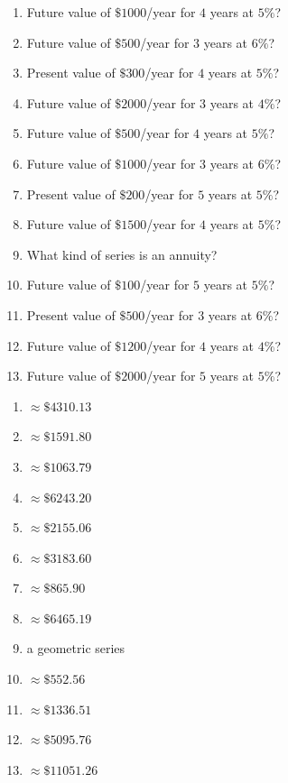 \documentclass[11pt]{article}
\begin{document}
\begin{recapbox}
\begin{multicols}{2}
\small
\begin{enumerate}[leftmargin=*,itemsep=3pt]
  \item Future value of $\$1000$/year for $4$ years at $5\%$?
  \item Future value of $\$500$/year for $3$ years at $6\%$?
  \item Present value of $\$300$/year for $4$ years at $5\%$?
  \item Future value of $\$2000$/year for $3$ years at $4\%$?
  \item Future value of $\$500$/year for $4$ years at $5\%$?
  \item Future value of $\$1000$/year for $3$ years at $6\%$?
  \item Present value of $\$200$/year for $5$ years at $5\%$?
  \item Future value of $\$1500$/year for $4$ years at $5\%$?
  \item What kind of series is an annuity?
  \item Future value of $\$100$/year for $5$ years at $5\%$?
  \item Present value of $\$500$/year for $3$ years at $6\%$?
  \item Future value of $\$1200$/year for $4$ years at $4\%$?
  \item Future value of $\$2000$/year for $5$ years at $5\%$?
\end{enumerate}
\end{multicols}
\end{recapbox}

\begin{keybox}
\begin{multicols}{2}
\small
\begin{enumerate}[leftmargin=*,itemsep=3pt]
  \item $\approx\$4310.13$
  \item $\approx\$1591.80$
  \item $\approx\$1063.79$
  \item $\approx\$6243.20$
  \item $\approx\$2155.06$
  \item $\approx\$3183.60$
  \item $\approx\$865.90$
  \item $\approx\$6465.19$
  \item a geometric series
  \item $\approx\$552.56$
  \item $\approx\$1336.51$
  \item $\approx\$5095.76$
  \item $\approx\$11051.26$
\end{enumerate}
\end{multicols}
\end{keybox}
\end{document}
